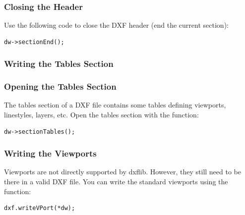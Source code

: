 \subsubsection*{Closing the Header}
Use the following code to close the DXF header (end the current section):
\begin{verbatim}
dw->sectionEnd();
\end{verbatim}

\subsubsection{Writing the Tables Section}
\subsubsection*{Opening the Tables Section}
The tables section of a DXF file contains some tables defining viewports, linestyles, layers, etc.
Open the tables section with the function:
\begin{verbatim}
dw->sectionTables();
\end{verbatim}

\subsubsection*{Writing the Viewports}
Viewports are not directly supported by dxflib. However, they still need to be there in a valid DXF file. You can write the standard viewports using the function:
\begin{verbatim}
dxf.writeVPort(*dw);
\end{verbatim}

